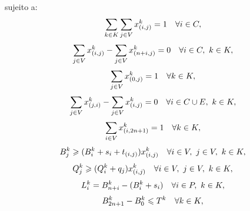 \noindent sujeito a:
%
\begin{equation} \label{eq:darp_constraint_1}
  \sum_{k \in K}
  \sum_{j \in V}
  x_{(i, j)}^{k} 
  = 1
  \quad 
  \forall i \in C,
\end{equation}
%
\begin{equation} \label{eq:darp_constraint_2}
  \sum_{j \in V}
  x_{(i, j)}^{k} 
  -
  \sum_{j \in V}
    x_{(n + i, j)}^{k} 
  = 0
  \quad 
  \forall i \in C, 
  \ k \in K,
\end{equation}
%
\begin{equation} \label{eq:darp_constraint_3}
  \sum_{j \in V}
  x_{(0, j)}^{k} 
  = 1
  \quad
  \forall k \in K,
\end{equation}
%
\begin{equation} \label{eq:darp_constraint_4}
  \sum_{j \in V}
   x_{(j, i)}^{k} 
   -
   \sum_{j \in V}
   x_{(i, j)}^{k} 
   = 0
   \quad
   \forall i \in C \cup E, 
   \ k \in K,
\end{equation}
%
\begin{equation} \label{eq:darp_constraint_5}
  \sum_{i \in V}
   x_{(i, 2n + 1)}^{k} 
   = 1
   \quad \forall k \in K,
\end{equation}
%
\begin{equation} \label{eq:darp_constraint_6}
  B_{j}^{k}
  \geqslant
  (B_{i}^{k} + s_i + t_{(i,j)})
  x_{(i, j)}^{k} 
  \quad
  \forall i \in V, 
  \ j \in V, 
  \ k \in K,
\end{equation}
%
\begin{equation} \label{eq:darp_constraint_7}
  Q^{k}_j
  \geqslant
  (Q^{k}_i + q_j)
  x_{(i, j)}^{k} 
  \quad
  \forall i \in V, 
  \ j \in V, 
  \ k \in K,
\end{equation}
%
\begin{equation} \label{eq:darp_constraint_8}
  L_i^k
  =
  B^k_{n+i}
  -
  (B^k_{i} + s_i)
  \quad
  \forall i \in P,
  \ k \in K,
\end{equation}
%
\begin{equation} \label{eq:darp_constraint_9}
  B^k_{2n + 1}
  -
  B^k_{0}
  \leqslant
  T^k
  \quad
  \forall k \in K,
\end{equation}
